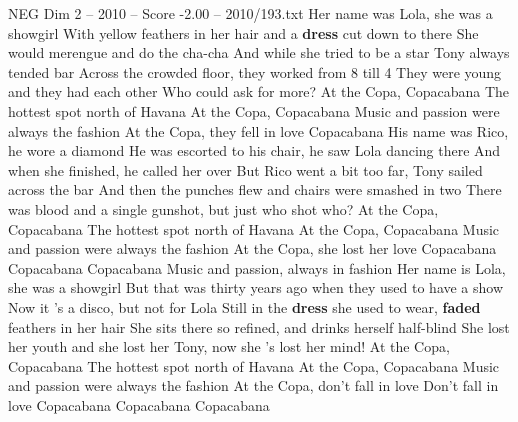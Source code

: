 \begin{textsample}{NEG Dim 2 – 2010 – Score -2.00 – 2010/193.txt}  \label{ex:f2_neg_020}
Her name was Lola, she was a showgirl With yellow feathers in her hair and a \textbf{dress} cut down to there She would merengue and do the cha-cha And while she tried to be a star Tony always tended bar Across the crowded floor, they worked from 8 till 4 They were young and they had each other Who could ask for more?
At the Copa, Copacabana The hottest spot north of Havana At the Copa, Copacabana Music and passion were always the fashion At the Copa, they fell in love Copacabana His name was Rico, he wore a diamond He was escorted to his chair, he saw Lola dancing there And when she finished, he called her over But Rico went a bit too far, Tony sailed across the bar And then the punches flew and chairs were smashed in two There was blood and a single gunshot, but just who shot who?
At the Copa, Copacabana The hottest spot north of Havana At the Copa, Copacabana Music and passion were always the fashion At the Copa, she lost her love Copacabana Copacabana Copacabana Music and passion, always in fashion Her name is Lola, she was a showgirl But that was thirty years ago when they used to have a show Now it 's a disco, but not for Lola Still in the \textbf{dress} she used to wear, \textbf{faded} feathers in her hair She sits there so refined, and drinks herself half-blind She lost her youth and she lost her Tony, now she 's lost her mind!
At the Copa, Copacabana The hottest spot north of Havana At the Copa, Copacabana Music and passion were always the fashion At the Copa, don't fall in love Don't fall in love Copacabana Copacabana Copacabana

\end{textsample}
